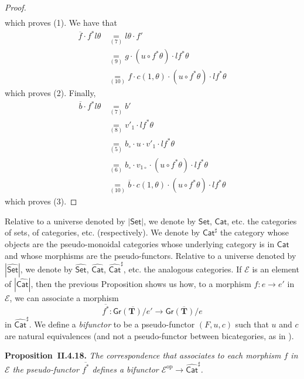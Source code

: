 \documentclass[fleqn]{article}
\newenvironment{itenv}[1]
  {\phantomsection\par\medskip\noindent\textbf{#1.}\itshape}
  {\par\medskip}
\newcommand{\oldpage}[1]{\marginpar{\footnotesize$\Big\vert$ \textit{p.~#1}}}
\newcommand{\TT}{\mathbf{T}}
\newcommand{\op}{\mathrm{op}}
\newcommand{\cat}[1]{\mathcal{#1}}
\newcommand{\Cat}[1]{\mathsf{#1}}
\newcommand{\set}[1]{|#1|}
\newcommand{\Gr}[1]{\Cat{Gr}(#1)}
\begin{document}
\begin{proof}
\[\begin{aligned}
    \end{aligned}
  \]
  which proves (1).
  We have that
  \[
    \begin{aligned}
      \overline{f}\cdot f^*l\theta
      &\underset{(7)}{=} l\theta\cdot f'
    \\&\underset{(9)}{=} g\cdot(u\circ f^*\theta)\cdot lf^*\theta
    \\&\underset{(10)}{=} f\cdot c(1,\theta)\cdot(u\circ f^*\theta)\cdot lf^*\theta
    \end{aligned}
  \]
  which proves (2).
  Finally,
  \[
    \begin{aligned}
      \overline{b}\cdot f^*l\theta
      &\underset{(7)}{=} b'
    \\&\underset{(8)}{=} v'_1\cdot lf^*\theta
    \\&\underset{(5)}{=} b_\circ\cdot u\cdot v'_1\cdot lf^*\theta
    \\&\underset{(6)}{=} b_\circ\cdot v_{1\circ}\cdot(u\circ f^*\theta)\cdot lf^*\theta
    \\&\underset{(10)}{=} \overline{b}\cdot c(1,\theta)\cdot(u\circ f^*\theta)\cdot lf^*\theta
    \end{aligned}
  \]
  which proves (3).
\end{proof}

Relative to a universe denoted by $\set{\Cat{Set}}$, we denote by $\Cat{Set}$, $\Cat{Cat}$, etc. the categories of sets, of categories, etc. (respectively).
\oldpage{266}
We denote by $\Cat{Cat}^\sharp$ the category whose objects are the pseudo-monoidal categories whose underlying category is in $\Cat{Cat}$ and whose morphisms are the pseudo-functors.
Relative to a universe denoted by $\set{\widehat{\Cat{Set}}}$, we denote by $\widehat{\Cat{Set}}$, $\widehat{\Cat{Cat}}$, $\widehat{\Cat{Cat}}^\sharp$, etc. the analogous categories.
If $\cat{E}$ is an element of $\set{\widehat{\Cat{Cat}}}$, then the previous Proposition shows us how, to a morphism $f\colon e\to e'$ in $\cat{E}$, we can associate a morphism
\[
  \overline{f^*}
  \colon \overline{\Gr{\TT}/e'}
  \to \overline{\Gr{\TT}/e}
\]
in $\widehat{\Cat{Cat}}^\sharp$.
We define a \emph{bifunctor} to be a pseudo-functor $(F,u,c)$ such that $u$ and $c$ are natural equivalences (and not a pseudo-functor between bicategories, as in \cite{Be}).

\begin{itenv}{Proposition~II.4.18}
  The correspondence that associates to each morphism $f$ in $\cat{E}$ the pseudo-functor $\overline{f^*}$ defines a bifunctor $\cat{E}^\op\to\widehat{\Cat{Cat}}^\sharp$.
\end{itenv}
\end{document}
